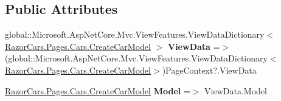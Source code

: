 \subsection*{Public Attributes}
\begin{DoxyCompactItemize}
\item 
\mbox{\label{class_razor_cars_1_1_pages_1_1_cars_1_1_pages___cars___create_car_a0b3e3fb9e53c7b573bf7438ee235825e}} 
global\+::\+Microsoft.\+Asp\+Net\+Core.\+Mvc.\+View\+Features.\+View\+Data\+Dictionary$<$ \mbox{\hyperlink{class_razor_cars_1_1_pages_1_1_cars_1_1_create_car_model}{Razor\+Cars.\+Pages.\+Cars.\+Create\+Car\+Model}} $>$ {\bfseries View\+Data} =$>$ (global\+::\+Microsoft.\+Asp\+Net\+Core.\+Mvc.\+View\+Features.\+View\+Data\+Dictionary$<$\mbox{\hyperlink{class_razor_cars_1_1_pages_1_1_cars_1_1_create_car_model}{Razor\+Cars.\+Pages.\+Cars.\+Create\+Car\+Model}}$>$)Page\+Context?.View\+Data
\item 
\mbox{\label{class_razor_cars_1_1_pages_1_1_cars_1_1_pages___cars___create_car_a5d4dc697b66254b6528156e587764d16}} 
\mbox{\hyperlink{class_razor_cars_1_1_pages_1_1_cars_1_1_create_car_model}{Razor\+Cars.\+Pages.\+Cars.\+Create\+Car\+Model}} {\bfseries Model} =$>$ View\+Data.\+Model
\end{DoxyCompactItemize}
